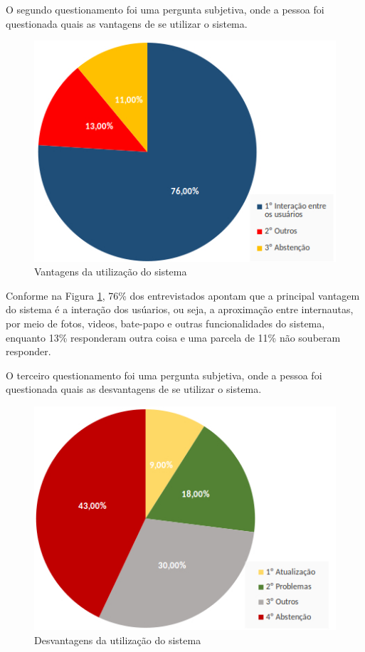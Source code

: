 \documentclass[
	12pt,				%
	openright,			%
	oneside,			%
	a4paper,			%
	english,			%
	french,				%
	spanish,			%
	brazil,				%
	]{abntex2}
\begin{document}
O segundo questionamento foi uma pergunta subjetiva, onde a pessoa foi questionada quais as vantagens de se utilizar o sistema.

\begin{figure}[h]
	\caption{\label{gr02}Vantagens da utilização do sistema}
	\begin{center}
		\includegraphics[scale=0.5]{graficos/02.jpg}
	\end{center}
\end{figure} 

Conforme na Figura \ref{gr02}, 76\% dos entrevistados apontam que a principal vantagem do sistema é a interação dos usúarios, ou seja, a aproximação entre internautas, por meio de fotos, videos, bate-papo e outras funcionalidades do sistema, enquanto 13\% responderam outra coisa e uma parcela de 11\% não souberam responder.

O terceiro questionamento foi uma pergunta subjetiva, onde a pessoa foi questionada quais as desvantagens de se utilizar o sistema.

\begin{figure}[h]
	\caption{\label{gr03}Desvantagens da utilização do sistema}
	\begin{center}
		\includegraphics[scale=0.5]{graficos/03.jpg}
	\end{center}
\end{figure}
\end{document}
